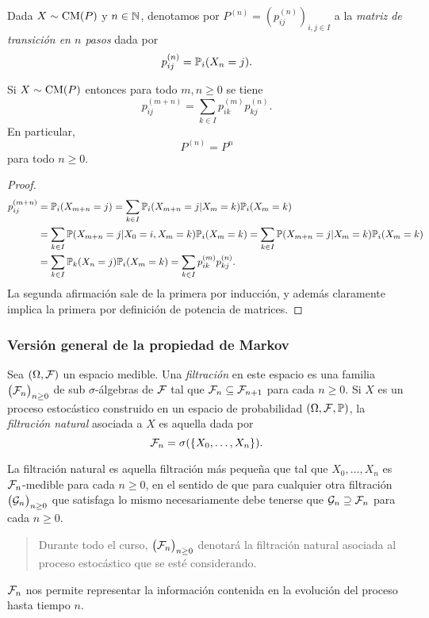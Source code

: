 \begin{defn}
Dada $X\sim\text{\upshape{CM}}(P)$ y $n\in\mathbb{N}$, denotamos por $P^{(n)}=(p^{(n)}_{ij})_{i,j\in I}$ a la \emph{matriz de transición en $n$ pasos} dada por
\[p^{(n)}_{ij}=\mathbb{P}_i(X_n=j).\]
\end{defn}

\begin{thm}
Si $X\sim\text{\upshape{CM}}(P)$ entonces para todo $m,n\geq0$ se tiene
\[p^{(m+n)}_{ij}=\sum_{k\in I}p^{(m)}_{ik}p^{(n)}_{kj}.\]
En particular,
\[P^{(n)}=P^n\]
para todo $n\geq0$.
\end{thm}

\begin{proof}
\begin{align}
p^{(m+n)}_{ij}&=\pp_i(X_{m+n}=j)=\sum_{k\in I}\pp_i(X_{m+n}=j|X_m=k)\pp_i(X_m=k)\\
&=\sum_{k\in I}\pp(X_{m+n}=j|X_0=i,X_m=k)\pp_i(X_m=k)=\sum_{k\in I}\pp(X_{m+n}=j|X_m=k)\pp_i(X_m=k)\hspace{-18pt}\\
&=\sum_{k\in I}\pp_k(X_{n}=j)\pp_i(X_m=k)=\sum_{k\in I}p^{(m)}_{ik}p^{(n)}_{kj}.
\end{align}
La segunda afirmación sale de la primera por inducción, y además claramente implica la primera por definición de potencia de matrices.
\end{proof}

\subsubsection{Versión general de la propiedad de Markov}

\begin{defn}
Sea $(\Omega,\mathcal{F})$ un espacio medible.
Una \emph{filtración} en este espacio es una familia $\big(\mathcal{F}_n\big)_{n\geq0}$ de sub $\sigma$-álgebras de $\mathcal{F}$ tal que $\mathcal{F}_n\subseteq\mathcal{F}_{n+1}$ para cada $n\geq0$.
\lsep
Si $X$ es un proceso estocástico construido en un espacio de probabilidad $(\Omega,\mathcal{F},\mathbb{P})$, la \emph{filtración natural} asociada a $X$ es aquella dada por
\[\mathcal{F}_n=\sigma(\{X_0,\dotsc,X_n\}).\]
\end{defn}

La filtración natural es aquella filtración más pequeña que tal que $X_0,\dotsc,X_n$ es $\mathcal{F}_n$-medible para cada $n\geq0$, en el sentido de que para cualquier otra filtración $\big(\mathcal{G}_n\big)_{n\geq0}$ que satisfaga lo mismo necesariamente debe tenerse que $\mathcal{G}_n\supseteq\mathcal{F}_n$ para cada $n\geq0$.
\begin{quote}
Durante todo el curso, $\big(\mathcal{F}_n\big)_{n\geq0}$ denotará la filtración natural asociada al proceso estocástico que se esté considerando.
\end{quote}
\lsep
$\mathcal{F}_n$ nos permite representar la información contenida en la evolución del proceso hasta tiempo $n$.

